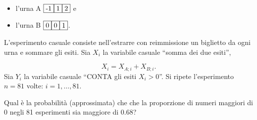\documentclass[
  11pt,
]{book}
\providecommand{\tightlist}{%
  \setlength{\itemsep}{0pt}\setlength{\parskip}{0pt}}
\theoremstyle{mytheoremstyle}
\theoremstyle{mydefstyle}
\begin{document}
\begin{itemize}
\tightlist
\item
  l'urna A \({\fbox{-1} \fbox{1} \fbox{2}}\) e\\
\item
  l'urna B \({\fbox{0} \fbox{0} \fbox{1}}\).
\end{itemize}

L'esperimento casuale consiste nell'estrarre con reimmissione un
biglietto da ogni urna e sommare gli esiti. Sia \(X_{i}\) la variabile
casuale ``somma dei due esiti'',

\[X_{i}=X_{A;  i} + X_{B;  i}.\] Sia \(Y_{i}\) la variabile casuale
``CONTA gli esiti \(X_{i}>0\)''. Si ripete l'esperimento \(n=81\) volte:
\(i=1,\ldots, 81\).

Qual è la probabilità (approssimata) che che la proporzione di numeri
maggiori di 0 negli 81 esperimenti sia maggiore di 0.68?
\end{document}
